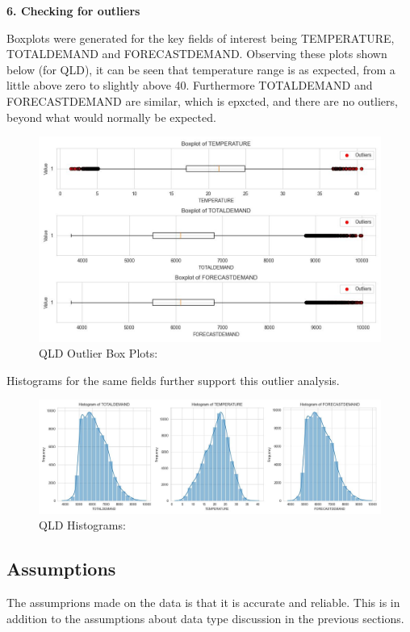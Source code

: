 \documentclass[
]{article}
\begin{document}
\textbf{6. Checking for outliers}

Boxplots were generated for the key fields of interest being
TEMPERATURE, TOTALDEMAND and FORECASTDEMAND. Observing these plots shown
below (for QLD), it can be seen that temperature range is as expected,
from a little above zero to slightly above 40. Furthermore TOTALDEMAND
and FORECASTDEMAND are similar, which is epxcted, and there are no
outliers, beyond what would normally be expected.

\begin{figure}
\centering
\includegraphics{img/OutlierBoxPlots.jpg}
\caption{QLD Outlier Box Plots:}
\end{figure}

Histograms for the same fields further support this outlier analysis.

\begin{figure}
\centering
\includegraphics{img/Histogram.jpg}
\caption{QLD Histograms:}
\end{figure}

\subsection{Assumptions}\label{assumptions}

The assumprions made on the data is that it is accurate and reliable.
This is in addition to the assumptions about data type discussion in the
previous sections.
\end{document}
